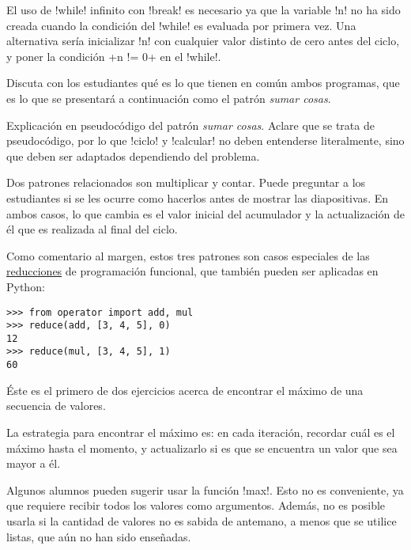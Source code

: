 \documentclass[10pt]{article}
\begin{document}
  El uso de \li!while! infinito con \li!break! es necesario
  ya que la variable \li!n! no ha sido creada
  cuando la condición del \li!while! es evaluada por primera vez.
  Una alternativa sería inicializar \li!n! con cualquier valor distinto de cero
  antes del ciclo, y poner la condición \li+n != 0+ en el \li!while!.

  Discuta con los estudiantes qué es lo que tienen en común ambos programas,
  que es lo que se presentará a continuación como el patrón \emph{sumar cosas}.


  Explicación en pseudocódigo del patrón \emph{sumar cosas}.
  Aclare que se trata de pseudocódigo,
  por lo que \li!ciclo! y \li!calcular!  no deben entenderse literalmente,
  sino que deben ser adaptados dependiendo del problema.


  Dos patrones relacionados son multiplicar y contar.
  Puede preguntar a los estudiantes si se les ocurre como hacerlos
  antes de mostrar las diapositivas.
  En ambos casos, lo que cambia es el valor inicial del acumulador
  y la actualización de él que es realizada al final del ciclo.

  Como comentario al margen,
  estos tres patrones son casos especiales
  de las \href{http://en.wikipedia.org/wiki/Reduce_(higher-order_function)}{reducciones} de programación funcional,
  que también pueden ser aplicadas en Python:
  \begin{lstlisting}
>>> from operator import add, mul
>>> reduce(add, [3, 4, 5], 0)
12
>>> reduce(mul, [3, 4, 5], 1)
60
  \end{lstlisting}


  Éste es el primero de dos ejercicios
  acerca de encontrar el máximo de una secuencia de valores.

  La estrategia para encontrar el máximo es:
  en cada iteración, recordar cuál es el máximo hasta el momento,
  y actualizarlo si es que se encuentra un valor que sea mayor a él.

  Algunos alumnos pueden sugerir usar la función \li!max!.
  Esto no es conveniente, ya que requiere recibir todos los valores como argumentos.
  Además, no es posible usarla si la cantidad de valores no es sabida de antemano,
  a menos que se utilice listas, que aún no han sido enseñadas.
\end{document}
